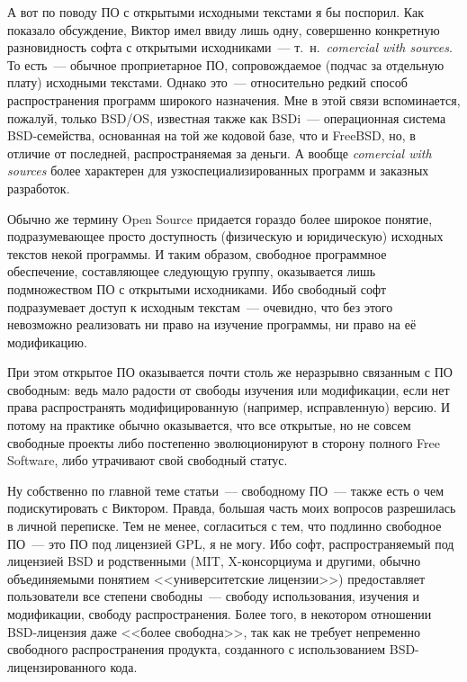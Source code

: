 А вот по поводу ПО с открытыми исходными текстами я бы поспорил. Как показало обсуждение, Виктор имел ввиду лишь одну, совершенно конкретную разновидность софта с открытыми исходниками~--- т.~н.~\textit{comercial with sources}. То есть~--- обычное проприетарное ПО, сопровождаемое (подчас за отдельную плату) исходными текстами. Однако это~--- относительно редкий способ распространения программ широкого назначения. Мне в этой связи вспоминается, пожалуй, только BSD/OS, известная также как BSDi~--- операционная система BSD-семейства, основанная на той же кодовой базе, что и FreeBSD, но, в отличие от последней, распространяемая за деньги. А вообще 
\textit{comercial with sources}
 более характерен для узкоспециализированных программ и заказных разработок.

Обычно же термину Open Source придается гораздо более широкое понятие, подразумевающее просто доступность (физическую и юридическую) исходных текстов некой программы. И таким образом, свободное программное обеспечение, составляющее следующую группу, оказывается лишь подмножеством ПО с открытыми исходниками. Ибо свободный софт подразумевает доступ к исходным текстам~--- очевидно, что без этого невозможно реализовать ни право на изучение программы, ни право на её модификацию.

При этом открытое ПО оказывается почти столь же неразрывно связанным с ПО свободным: ведь мало радости от свободы изучения или модификации, если нет права распространять модифицированную (например, исправленную) версию. И потому на практике обычно оказывается, что все открытые, но не совсем свободные проекты либо постепенно эволюционируют в сторону полного Free Software, либо утрачивают свой свободный статус.

Ну собственно по главной теме статьи~--- свободному ПО~--- также есть о чем подискутировать с Виктором. Правда, большая часть моих вопросов разрешилась в личной переписке. Тем не менее, согласиться с тем, что подлинно свободное ПО~--- это ПО под лицензией GPL, я не могу. Ибо софт, распространяемый под лицензией BSD и родственными (MIT, X-консорциума и другими, обычно объединяемыми понятием <<университетские лицензии>>) предоставляет пользователи все степени свободны~--- свободу использования, изучения и модификации, свободу распространения. Более того, в некотором отношении BSD-лицензия даже <<более свободна>>, так как не требует непременно свободного распространения продукта, созданного с использованием BSD-лицензированного кода.

